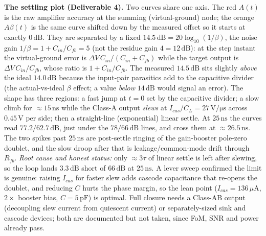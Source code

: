 \documentclass[11pt]{article}
\begin{document}
\noindent\textbf{The settling plot (Deliverable 4).} Two curves share one axis. The red
$A(t)$ is the raw amplifier accuracy at the summing (virtual-ground) node; the orange
$A\beta(t)$ is the same curve shifted down by the measured offset so it starts at exactly
$0\,\mathrm{dB}$. They are separated by a fixed $14.5\,\mathrm{dB}=20\log_{10}(1/\beta)$,
the noise gain $1/\beta=1+C_{in}/C_{fb}=5$ (not the residue gain $4=12\,\mathrm{dB}$): at
the step instant the virtual-ground error is $\Delta V\,C_{in}/(C_{in}+C_{fb})$ while the
target output is $\Delta V\,C_{in}/C_{fb}$, whose ratio is $1+C_{in}/C_{fb}$. The measured
$14.5\,\mathrm{dB}$ sits slightly \emph{above} the ideal $14.0\,\mathrm{dB}$ because the
input-pair parasitics add to the capacitive divider (the actual-vs-ideal $\beta$ effect; a
value \emph{below} $14\,\mathrm{dB}$ would signal an error). The shape has three regions: a
fast jump at $t=0$ set by the capacitive divider; a slow climb for $\approx15\,\mathrm{ns}$
while the Class-A output \emph{slews} at $I_{cas}/C_L=27\,\mathrm{V/\mu s}$ across
$0.45\,\mathrm{V}$ per side; then a straight-line (exponential) linear settle. At
$25\,\mathrm{ns}$ the curves read $77.2/62.7\,\mathrm{dB}$, just under the $78/66\,\mathrm{dB}$
lines, and cross them at $\approx26.5\,\mathrm{ns}$. The two spikes past $25\,\mathrm{ns}$
are post-settle ringing of the gain-booster pole-zero doublet, and the slow droop after
that is leakage/common-mode drift through $R_{fb}$. \emph{Root cause and honest status:}
only $\approx3\tau$ of linear settle is left after slewing, so the loop lands $3.3\,\mathrm{dB}$
short of $66\,\mathrm{dB}$ at $25\,\mathrm{ns}$. A lever sweep confirmed the limit is
genuine: raising $I_{cas}$ for faster slew adds cascode capacitance that re-opens the
doublet, and reducing $C$ hurts the phase margin, so the lean point ($I_{cas}=136\,\mu\mathrm{A}$,
$2\times$ booster bias, $C=5\,\mathrm{pF}$) is optimal. Full closure needs a Class-AB output
(decoupling slew current from quiescent current) or separately-sized sink and cascode
devices; both are documented but not taken, since FoM, SNR and power already pass.
\end{document}
